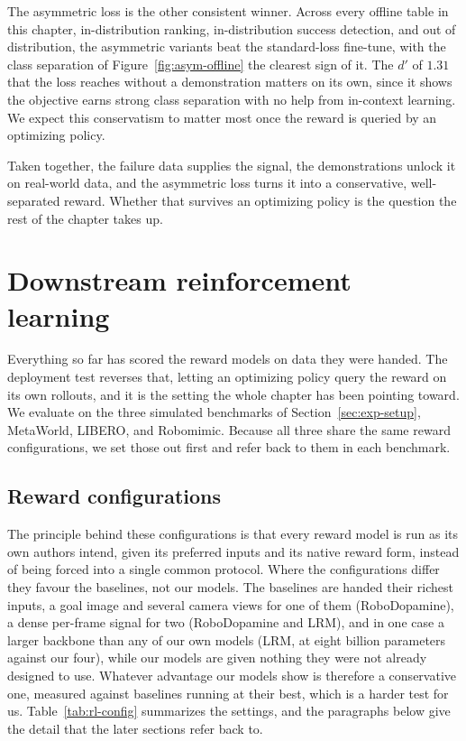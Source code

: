 The asymmetric loss is the other consistent winner. Across every offline table in this chapter, in-distribution ranking, in-distribution success detection, and out of distribution, the asymmetric variants beat the standard-loss fine-tune, with the class separation of Figure~\ref{fig:asym-offline} the clearest sign of it. The $d'$ of $1.31$ that the loss reaches without a demonstration matters on its own, since it shows the objective earns strong class separation with no help from in-context learning. We expect this conservatism to matter most once the reward is queried by an optimizing policy.

Taken together, the failure data supplies the signal, the demonstrations unlock it on real-world data, and the asymmetric loss turns it into a conservative, well-separated reward. Whether that survives an optimizing policy is the question the rest of the chapter takes up.

\section{Downstream reinforcement learning}
\label{sec:results-rl}

Everything so far has scored the reward models on data they were handed. The deployment test reverses that, letting an optimizing policy query the reward on its own rollouts, and it is the setting the whole chapter has been pointing toward. We evaluate on the three simulated benchmarks of Section~\ref{sec:exp-setup}, MetaWorld, LIBERO, and Robomimic. Because all three share the same reward configurations, we set those out first and refer back to them in each benchmark.

\subsection{Reward configurations}
\label{sec:results-rl-config}

The principle behind these configurations is that every reward model is run as its own authors intend, given its preferred inputs and its native reward form, instead of being forced into a single common protocol. Where the configurations differ they favour the baselines, not our models. The baselines are handed their richest inputs, a goal image and several camera views for one of them (RoboDopamine), a dense per-frame signal for two (RoboDopamine and LRM), and in one case a larger backbone than any of our own models (LRM, at eight billion parameters against our four), while our models are given nothing they were not already designed to use. Whatever advantage our models show is therefore a conservative one, measured against baselines running at their best, which is a harder test for us. Table~\ref{tab:rl-config} summarizes the settings, and the paragraphs below give the detail that the later sections refer back to.

